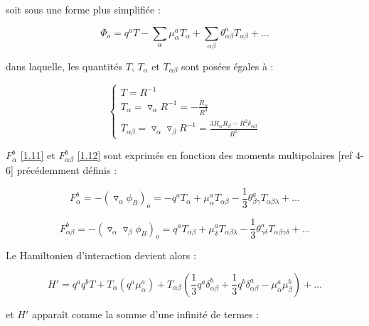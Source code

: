 	soit sous une forme plus simplifiée : 
	
	\begin{equation}
	\Phi_{o} = q^{a} T - \sum_{\alpha} \mu_{\alpha}^{a} T_{\alpha} + \sum_{\alpha\beta} \theta_{\alpha\beta}^{a} T_{\alpha\beta} + \ldots
	\end{equation}
	
        \noindent dans laquelle, les quantités $T$, $T_{\alpha}$ et $T_{\alpha\beta}$ sont posées égales à :
	
	\begin{equation}
	\begin{cases}
	T = R^{-1} \\
	T_{\alpha} = \triangledown_{\alpha} R^{-1} = - \frac{R_{\alpha}}{R^{3}}\\
	T_{\alpha\beta} = \triangledown_{\alpha} \triangledown_{\beta} R^{-1} = \frac{3R_{\alpha} R_{\beta}- R^{2}\delta_{\alpha\beta}}{R^{5}}
	\end{cases}
	\end{equation}
	
	$F_{\alpha}^{b}$ \ref{1.11} et $F_{\alpha\beta}^{b}$ \ref{1.12} sont exprimés en fonction des moments multipolaires [ref 4-6] précédemment définis : 
	
	\begin{equation}
	F_{\alpha}^{b} = -(\triangledown_{\alpha}\phi_{B})_{o} = -q^{a} T_{\alpha} + \mu_{\alpha}^{a} T_{\alpha\beta} - \frac{1}{3} \theta_{\beta\gamma}^{a} T_{\alpha\beta\lambda} + \ldots 
	\end{equation}
	
	\begin{equation}
	F_{\alpha\beta}^{b} = -(\triangledown_{\alpha} \triangledown_{\beta}\phi_{B})_{o} = q^{a} T_{\alpha\beta} + \mu_{\delta}^{a} T_{\alpha\beta\lambda} - \frac{1}{3} \theta_{\gamma\delta}^{a} T_{\alpha\beta\gamma\delta} + \ldots 
	\end{equation}
	
	Le Hamiltonien d'interaction devient alors : 
	
	\begin{equation}
	H' = q^{a} q^{b} T + T_{\alpha}(q^{a} \mu_{\alpha}^{a}) + T_{\alpha\beta} (\frac{1}{3}q^{a}\delta^{b}_{\alpha\beta}+ \frac{1}{3} q^{b}\delta^{a}_{\alpha\beta} - \mu_{\alpha}^{a}\mu_{\beta}^{b}) + \ldots  \label{1.19}
	\end{equation}
	
	\noindent et $H'$ apparaît comme la somme d'une infinité de termes : 
	
